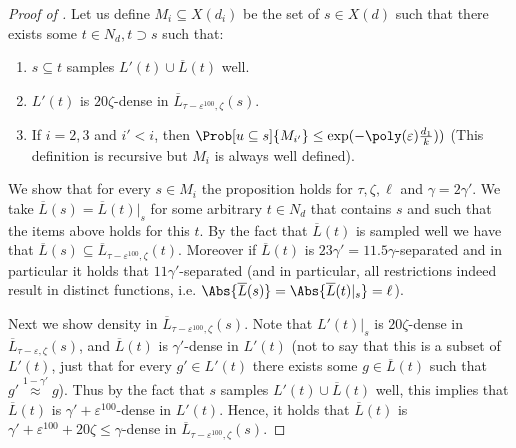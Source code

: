 \begin{proof}[Proof of ]
    Let us define \(M_i \subseteq X(d_i)\) be the set of \(s \in X(d)\) such that there exists some \(t \in N_d, t\supset s\) such that:
    \begin{enumerate}
        \item \(s \subseteq t\) samples \(L'(t) \cup \overline{L}(t)\) well.
        \item \(L'(t)\) is \(20\zeta\)-dense in \(\overline{L}_{\tau-\varepsilon^{100},\zeta}(s)\).
        \item If \(i=2,3\) and \(i' < i\), then \(\Prob[u \subseteq s]{M_{i'}} \leq \exp(-\poly(\varepsilon)\frac{d_1}{k}))\) (This definition is recursive but \(M_i\) is always well defined).
    \end{enumerate}
    We show that for every \(s \in M_i\) the proposition holds for \(\tau,\zeta,\ell\) and \(\gamma=2\gamma'\). We take \(\overline{L}(s)=\overline{L}(t)|_s\) for some arbitrary \(t \in N_d\) that contains \(s\) and such that the items above holds for this \(t\). By the fact that \(\overline{L}(t)\) is sampled well we have that \(\overline{L}(s) \subseteq \overline{L}_{\tau-\varepsilon^{100},\zeta}(t)\). Moreover if \(\overline{L}(t)\) is \(23\gamma'=11.5\gamma\)-separated and in particular it holds that \(11\gamma'\)-separated (and in particular, all restrictions indeed result in distinct functions, i.e. \(\Abs{\overline{L}(s)}=\Abs{\overline{L}(t)|_s}=\ell\)). 
    
    Next we show density in \(\overline{L}_{\tau-\varepsilon^{100},\zeta}(s)\). Note that \(L'(t)|_s\) is \(20\zeta\)-dense in \(\overline{L}_{\tau-\varepsilon,\zeta}(s)\), and \(\overline{L}(t)\) is \(\gamma'\)-dense in \(L'(t)\) (not to say that this is a subset of \(L'(t)\), just that for every \(g' \in L'(t)\) there exists some \(g \in \overline{L}(t)\) such that \(g' \overset{1-\gamma'}{\approx} g\)). Thus by the fact that \(s\) samples \(L'(t) \cup \overline{L}(t)\) well, this implies that \(\overline{L}(t)\) is \(\gamma'+\varepsilon^{100}\)-dense in \(L'(t)\). Hence, it holds that \(\overline{L}(t)\) is \(\gamma'+\varepsilon^{100}+20\zeta\leq \gamma\)-dense in \(\overline{L}_{\tau-\varepsilon^{100},\zeta}(s)\).


\end{proof}
